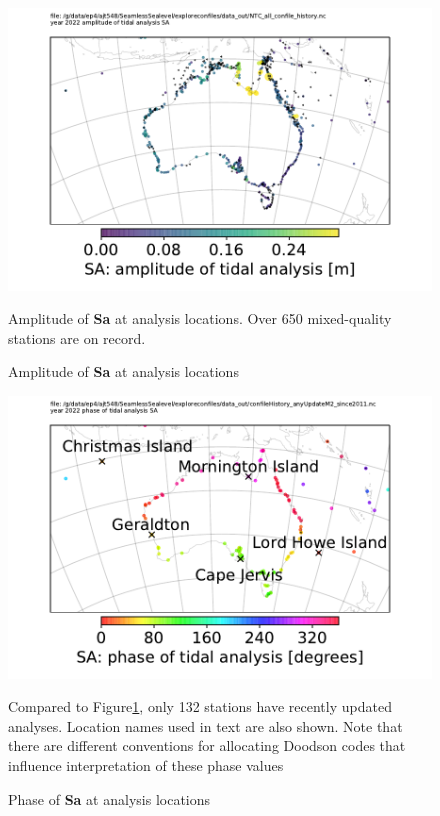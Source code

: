 \begin{figure}[!hbt] \centering
    \includegraphics[trim={0 0 0 1cm},clip,width=\figwidthBig]{figures/maps/locations_SaAmp.pdf} 
    \caption{Amplitude of \textbf{Sa} at analysis locations}
    {Amplitude of \textbf{Sa} at analysis locations. Over 650 mixed-quality stations are on record.}
    \label{fig:SaAmp}
\end{figure}

\begin{figure}[!hbt] \centering
    \includegraphics[trim={0 0 0 1cm},clip,width=\figwidthBig]{figures/maps/locations_SaPhaAnyM2Update.pdf} 
    \caption{Phase of \textbf{Sa} at analysis locations}
    {Compared to Figure\ref{fig:SaAmp}, only 132 stations have recently updated analyses. Location names used in text are also shown. Note that there are different conventions for allocating Doodson codes that influence interpretation of these phase values \citep[10.4]{PCTMSL-sp9}}
    \label{fig:SaPha}
\end{figure}   


